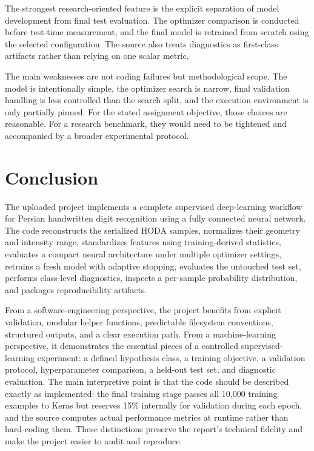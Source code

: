 \documentclass[11pt,a4paper]{article}
\begin{document}
The strongest research-oriented feature is the explicit separation of model development from final test evaluation. The optimizer comparison is conducted before test-time measurement, and the final model is retrained from scratch using the selected configuration. The source also treats diagnostics as first-class artifacts rather than relying on one scalar metric.

The main weaknesses are not coding failures but methodological scope. The model is intentionally simple, the optimizer search is narrow, final validation handling is less controlled than the search split, and the execution environment is only partially pinned. For the stated assignment objective, those choices are reasonable. For a research benchmark, they would need to be tightened and accompanied by a broader experimental protocol.

\section{Conclusion}
The uploaded project implements a complete supervised deep-learning workflow for Persian handwritten digit recognition using a fully connected neural network. The code reconstructs the serialized HODA samples, normalizes their geometry and intensity range, standardizes features using training-derived statistics, evaluates a compact neural architecture under multiple optimizer settings, retrains a fresh model with adaptive stopping, evaluates the untouched test set, performs class-level diagnostics, inspects a per-sample probability distribution, and packages reproducibility artifacts.

From a software-engineering perspective, the project benefits from explicit validation, modular helper functions, predictable filesystem conventions, structured outputs, and a clear execution path. From a machine-learning perspective, it demonstrates the essential pieces of a controlled supervised-learning experiment: a defined hypothesis class, a training objective, a validation protocol, hyperparameter comparison, a held-out test set, and diagnostic evaluation. The main interpretive point is that the code should be described exactly as implemented: the final training stage passes all 10,000 training examples to Keras but reserves 15\% internally for validation during each epoch, and the source computes actual performance metrics at runtime rather than hard-coding them. These distinctions preserve the report's technical fidelity and make the project easier to audit and reproduce.
\end{document}
